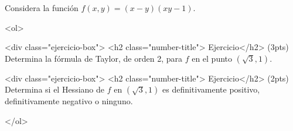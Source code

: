 \documentclass[12pt]{article}
\begin{document}
\bigskip

            
\bigskip
\bigskip
\bigskip


Considera la función $f(x,y)=(x-y)(xy-1)$.



<ol>

<div class="ejercicio-box"> <h2 class="number-title"> Ejercicio</h2> (3pts) Determina la fórmula de Taylor, de orden 2, para $f$
  en el punto $(\sqrt{3},1)$.



  \vspace{8cm}


<div class="ejercicio-box"> <h2 class="number-title"> Ejercicio</h2> (2pts) Determina si el Hessiano de $f$ en $(\sqrt{3},1)$ es
  definitivamente positivo, definitivamente negativo o ninguno.


  

</ol>
 





  
\end{document}

